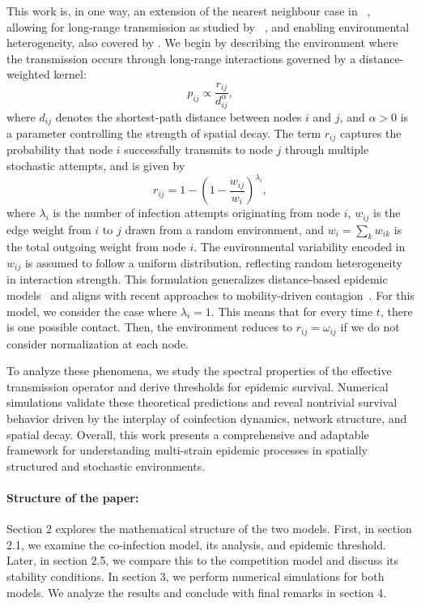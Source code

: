 \documentclass[a4paper,12pt]{scrartcl}
\theoremstyle{plain}%
\theoremstyle{definition}
\theoremstyle{remark}
\numberwithin{equation}{section}
\begin{document}
This work is, in one way, an extension of the nearest neighbour case in ~\cite{Namugera2025contact}, allowing for long-range transmission as studied by ~\cite{estrada2011epidemic}, and enabling environmental heterogeneity, also covered by \cite{gomez2010discrete}. 
We begin by describing the environment where the transmission occurs through long-range interactions governed by a distance-weighted kernel:
\[
p_{ij} \propto \frac{r_{ij}}{d_{ij}^\alpha},
\]
where \( d_{ij} \) denotes the shortest-path distance between nodes \( i \) and \( j \), and \( \alpha > 0 \) is a parameter controlling the strength of spatial decay. The term \( r_{ij} \) captures the probability that node \( i \) successfully transmits to node \( j \) through multiple stochastic attempts, and is given by
\[
r_{ij} = 1 - \left( 1 - \frac{w_{ij}}{w_i} \right)^{\lambda_i},
\]
where \( \lambda_i \) is the number of infection attempts originating from node \( i \), \( w_{ij} \) is the edge weight from \( i \) to \( j \) drawn from a random environment, and \( w_i = \sum_k w_{ik} \) is the total outgoing weight from node \( i \). The environmental variability encoded in \( w_{ij} \) is assumed to follow a uniform distribution, reflecting random heterogeneity in interaction strength. This formulation generalizes distance-based epidemic models~\cite{juhasz2015longrange} and aligns with recent approaches to mobility-driven contagion~\cite{he2020covid}. For this model, we consider the case where $\lambda_i = 1$. This means that for every time $t$, there is one possible contact. Then, the environment reduces to $r_{ij} = \omega_{ij}$ if we do not consider normalization at each node.


To analyze these phenomena, we study the spectral properties of the effective transmission operator and derive thresholds for epidemic survival. Numerical simulations validate these theoretical predictions and reveal nontrivial survival behavior driven by the interplay of coinfection dynamics, network structure, and spatial decay. Overall, this work presents a comprehensive and adaptable framework for understanding multi-strain epidemic processes in spatially structured and stochastic environments.


\paragraph{Structure of the paper:} Section 2 explores the mathematical structure of the two models. First, in section 2.1, we examine the co-infection model, its analysis, and epidemic threshold. Later, in section 2.5, we compare this to the competition model and discuss its stability conditions. In section 3, we perform numerical simulations for both models. We analyze the results and conclude with final remarks in section 4. 
\end{document}
